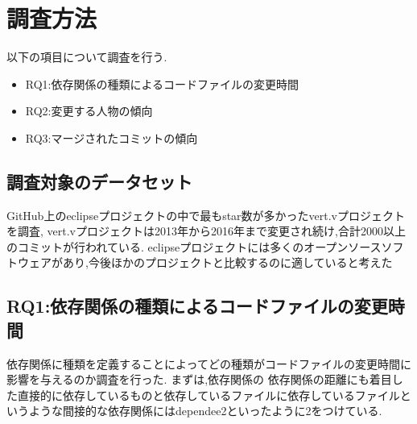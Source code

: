 \documentclass[submit,ses,noauthor]{ipsj} %
\begin{document}
                                                                                                                                                                                                                                                                                                                                                                                                                                                                                                                                                                                                                                                                                                                                                                                                                                                                                                                                                                                                                                                                                                                                                                                                                                                                                                                                                                                 
\section{調査方法}\label{調査方法}
以下の項目について調査を行う.
\begin{itemize}
\item RQ1:依存関係の種類によるコードファイルの変更時間
\item RQ2:変更する人物の傾向
\item RQ3:マージされたコミットの傾向
\end{itemize}

\subsection{調査対象のデータセット}
GitHub上のeclipseプロジェクトの中で最もstar数が多かったvert.vプロジェクトを調査,
vert.vプロジェクトは2013年から2016年まで変更され続け,合計2000以上のコミットが行われている.
eclipseプロジェクトには多くのオープンソースソフトウェアがあり,今後ほかのプロジェクトと比較するのに適していると考えた


\subsection{RQ1:依存関係の種類によるコードファイルの変更時間}
依存関係に種類を定義することによってどの種類がコードファイルの変更時間に影響を与えるのか調査を行った.
まずは,依存関係の
依存関係の距離にも着目した直接的に依存しているものと依存しているファイルに依存しているファイルというような間接的な依存関係にはdependee2といったように2をつけている.
\end{document}
